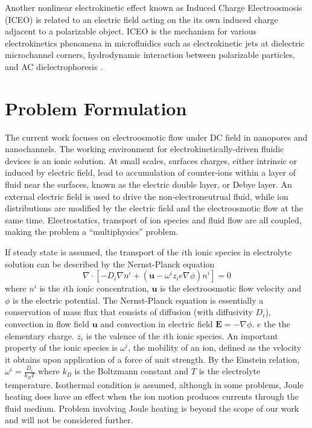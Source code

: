 Another nonlinear electrokinetic effect known as Induced Charge Electroosmosis (ICEO) \cite{murtsovkin96,Squires2004} is related to an electric field acting on the its own induced charge adjacent to a polarizable object. ICEO is the mechanism for various electrokinetics phenomena in microfluidics such as electrokinetic jets at dielectric microchannel corners, hydrodynamic interaction between polarizable particles, and AC dielectrophoresis \cite{bazant2004induced,levitan2005experimental,basuray2007induced,bazant2009towards,schnitzer2012induced,schnitzer2014strong}. 

\section{Problem Formulation}
The current work focuses on electroosmotic flow under DC field in nanopores and nanochannels.  The working environment for electrokinetically-driven fluidic devices is an ionic solution. At small scales, surfaces charges, either intrinsic or induced by electric field, lead to accumulation of counter-ions within a layer of fluid near the surfaces, known as the electric double layer, or Debye layer. An external electric field is used to drive the non-electroneutrual fluid, while ion distributions are modified by the electric field and the electroosmotic flow at the same time. Electrostatics, transport of ion species and fluid flow are all coupled, making the problem a ``multiphysics'' problem.

If steady state is assumed, the transport of the $i$th ionic species in electrolyte solution can be described by the Nernst-Planck equation \cite{landau1981course}
\begin{equation}
\nabla \cdot \left[ -D_i \nabla n^i  + \left(\mathbf{u} - \omega^i z_i e\nabla\phi \right)n^i  \right] = 0
\label{eq:nernst-planck}
\end{equation}
where $n^i$ is the $i$th ionic concentration, $\mathbf{u}$ is the electroosmotic flow velocity and $\phi$ is the electric potential. The Nernst-Planck equation is essentially a conservation of mass flux that consists of diffusion (with diffusivity $D_i$), convection in flow field $\mathbf{u}$ and convection in electric field $\mathbf{E} = -\nabla \phi$. $e$ the the elementary charge. $z_i$ is the valence of the $i$th ionic species. An important property of the ionic species is $\omega^i$, the mobility of an ion, defined as the velocity it obtains upon application of a force of unit strength.  By the Einstein relation, $\omega^i=\frac{D_i}{k_B T}$ where $k_B$ is the Boltzmann constant and $T$ is the electrolyte temperature. Isothermal condition is assumed, although in some problems, Joule heating does have an effect when the ion motion produces currents through the fluid medium\cite{sridharan2011joule}. Problem involving Joule heating is beyond the scope of our work and will not be considered further.

